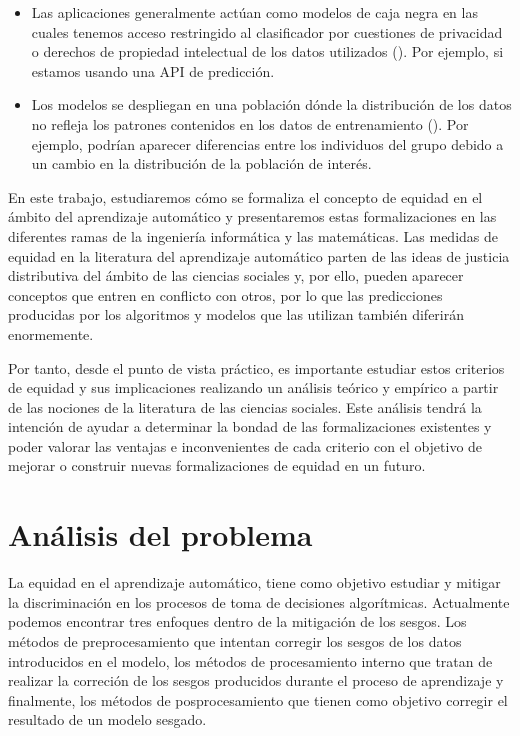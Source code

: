 \documentclass[oneside,openright,titlepage,numbers=noenddot,openany,headinclude,footinclude=true,
cleardoublepage=empty,abstractoff,BCOR=5mm,paper=a4,fontsize=12pt,main=spanish]{scrreprt}
\begin{document}
\begin{itemize}
    \item Las aplicaciones generalmente actúan como modelos de caja negra en las cuales tenemos acceso restringido al clasificador por cuestiones de privacidad o derechos de propiedad intelectual de los datos utilizados (\cite{blackbox2014}). Por ejemplo, si estamos usando una API de predicción.
	\item Los modelos se despliegan en una población dónde la distribución de los datos no refleja los patrones contenidos en los datos de entrenamiento (\cite{distributionmodel2017}). Por ejemplo, podrían aparecer diferencias entre los individuos del grupo debido a un cambio en la distribución de la población de interés.
\end{itemize}

En este trabajo, estudiaremos cómo se formaliza el concepto de equidad en el ámbito del aprendizaje automático y presentaremos estas formalizaciones en las diferentes ramas de la ingeniería informática y las matemáticas. Las medidas de equidad en la literatura del aprendizaje automático parten de las ideas de justicia distributiva del ámbito de las ciencias sociales y, por ello, pueden aparecer conceptos que entren en conflicto con otros, por lo que las predicciones producidas por los algoritmos y modelos que las utilizan también diferirán enormemente. 

Por tanto, desde el punto de vista práctico, es importante estudiar estos criterios de equidad y sus implicaciones realizando un análisis teórico y empírico a partir de las nociones de la literatura de las ciencias sociales. Este análisis tendrá la intención de ayudar a determinar la bondad de las formalizaciones existentes y poder valorar las ventajas e inconvenientes de cada criterio con el objetivo de mejorar o construir nuevas formalizaciones de equidad en un futuro. 

\section{Análisis del problema}

La equidad en el aprendizaje automático, tiene como objetivo estudiar y mitigar la discriminación en los procesos de toma de decisiones algorítmicas. Actualmente podemos encontrar tres enfoques dentro de la mitigación de los sesgos. Los métodos de preprocesamiento que intentan corregir los sesgos de los datos introducidos en el modelo, los métodos de procesamiento interno que tratan de realizar la correción de los sesgos producidos durante el proceso de aprendizaje y finalmente, los métodos de posprocesamiento que tienen como objetivo corregir el resultado de un modelo sesgado.
\end{document}
